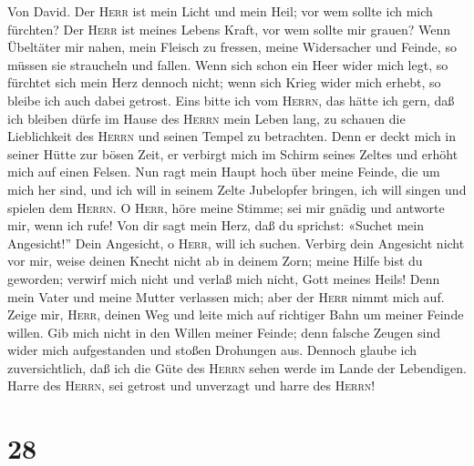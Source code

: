  Von David. Der \textsc{Herr} ist mein Licht und mein
Heil; vor wem sollte ich mich fürchten? Der \textsc{Herr} ist meines
Lebens Kraft, vor wem sollte mir grauen?  Wenn Übeltäter
mir nahen, mein Fleisch zu fressen, meine Widersacher und Feinde, so
müssen sie straucheln und fallen.  Wenn sich schon ein
Heer wider mich legt, so fürchtet sich mein Herz dennoch nicht; wenn
sich Krieg wider mich erhebt, so bleibe ich auch dabei getrost.
 Eins bitte ich vom \textsc{Herrn}, das hätte ich gern,
daß ich bleiben dürfe im Hause des \textsc{Herrn} mein Leben lang, zu
schauen die Lieblichkeit des \textsc{Herrn} und seinen Tempel zu
betrachten.  Denn er deckt mich in seiner Hütte zur bösen
Zeit, er verbirgt mich im Schirm seines Zeltes und erhöht mich auf einen
Felsen.  Nun ragt mein Haupt hoch über meine Feinde, die
um mich her sind, und ich will in seinem Zelte Jubelopfer bringen, ich
will singen und spielen dem \textsc{Herrn}.  O
\textsc{Herr}, höre meine Stimme; sei mir gnädig und antworte mir, wenn
ich rufe!  Von dir sagt mein Herz, daß du sprichst:
«Suchet mein Angesicht!'' Dein Angesicht, o \textsc{Herr}, will ich
suchen.  Verbirg dein Angesicht nicht vor mir, weise
deinen Knecht nicht ab in deinem Zorn; meine Hilfe bist du geworden;
verwirf mich nicht und verlaß mich nicht, Gott meines Heils!
 Denn mein Vater und meine Mutter verlassen mich; aber
der \textsc{Herr} nimmt mich auf.  Zeige mir,
\textsc{Herr}, deinen Weg und leite mich auf richtiger Bahn um meiner
Feinde willen.  Gib mich nicht in den Willen meiner
Feinde; denn falsche Zeugen sind wider mich aufgestanden und stoßen
Drohungen aus.  Dennoch glaube ich zuversichtlich, daß
ich die Güte des \textsc{Herrn} sehen werde im Lande der Lebendigen.
 Harre des \textsc{Herrn}, sei getrost und unverzagt und
harre des \textsc{Herrn}!

\hypertarget{section-27}{%
\section{28}\label{section-27}}

